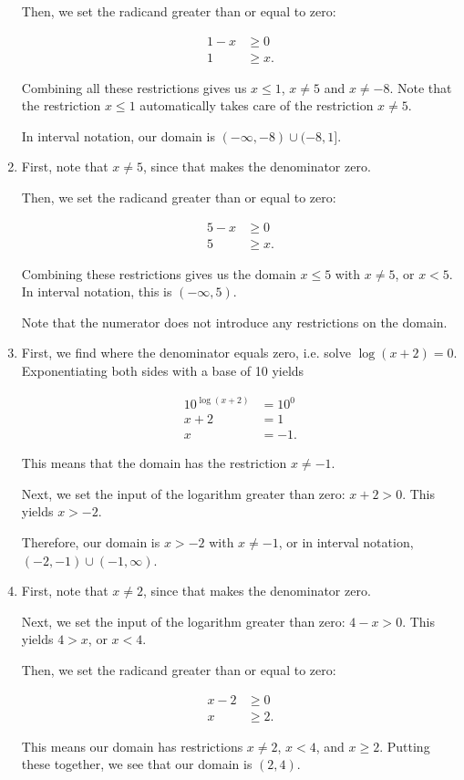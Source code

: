 \documentclass{ximera}
\begin{document}
\begin{explanation}
\begin{enumerate}
Then, we set the radicand greater than or equal to zero:

\begin{align*}1 - x&\ge 0 \\ 1 & \ge x. \end{align*}

Combining all these restrictions gives us $x \le 1$, $x \ne 5$ and $x \ne -8$. Note that the restriction $x \le 1$ automatically takes care of the restriction $x \ne 5$. 

In interval notation, our domain is $(- \infty, -8) \cup (-8, 1]$. 

	\item First, note that $x \ne 5$, since that makes the denominator zero.

Then, we set the radicand greater than or equal to zero:

\begin{align*}5 - x&\ge 0 \\ 5 & \ge x. \end{align*}

Combining these restrictions gives us the domain $x \le 5$ with $x \ne 5$, or $x < 5$. In interval notation, this is $(-\infty, 5)$.

Note that the numerator does not introduce any restrictions on the domain. 

	\item First, we find where the denominator equals zero, i.e. solve $\log(x + 2) = 0$. Exponentiating both sides with a base of 10 yields

\begin{align*}10^{\log(x + 2)} & = 10^0 \\ x + 2 & = 1 \\ x & = -1. \end{align*}

This means that the domain has the restriction $x \ne -1$. 

Next, we set the input of the logarithm greater than zero: $x + 2 > 0$. This yields $x > -2$.

Therefore, our domain is $x > -2$ with $x \ne -1$, or in interval notation, $(-2, -1) \cup (-1, \infty)$. 

	\item First, note that $x \ne 2$, since that makes the denominator zero.

Next, we set the input of the logarithm greater than zero: $4 - x > 0$. This yields $4 > x$, or $x < 4$.

Then, we set the radicand greater than or equal to zero:

\begin{align*}x - 2&\ge 0 \\ x & \ge 2. \end{align*}

This means our domain has restrictions $x \ne 2$, $x < 4$, and $x \ge 2$. Putting these together, we see that our domain is $(2, 4)$. 
\end{enumerate}
\end{explanation}

\end{document}
